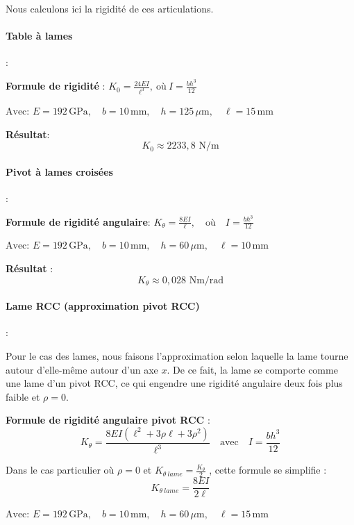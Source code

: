 \documentclass[a4paper, 11pt]{article} %
\begin{document}
Nous calculons ici la rigidité de ces articulations.

\paragraph{Table à lames} :

\textbf{Formule de rigidité} : $ K_0 = \frac{24EI}{\ell^3},\ \text{où}\ I = \frac{b h^3}{12} $


$\text{Avec: } E = 192\,\text{GPa},\quad b = 10\,\text{mm},\quad h = 125\,\mu\text{m},\quad \ell = 15\,\text{mm} $


\textbf{Résultat}: $$K_0 \approx 2233,8\text{ N}/\text{m}$$

\vspace{0.25cm}

\paragraph{Pivot à lames croisées}:

\textbf{Formule de rigidité angulaire}:
$K_\theta = \frac{8EI}{\ell}, \quad \text{où} \quad I = \frac{b h^3}{12}$



$\text{Avec: } E = 192\,\text{GPa},\quad b = 10\,\text{mm},\quad h = 60\,\mu\text{m},\quad \ell = 10\,\text{mm} $


\textbf{Résultat} : $$K_\theta \approx 0,028\text{ N}\text{m}/\text{rad}$$
 
 \paragraph{Lame RCC (approximation pivot RCC)}:
 
Pour le cas des lames, nous faisons l'approximation selon laquelle la lame tourne autour d'elle-même autour d’un axe $x$. De ce fait, la lame se comporte comme une lame d’un pivot RCC, ce qui engendre une rigidité angulaire deux fois plus faible et $\rho = 0$.

\textbf{Formule de rigidité angulaire pivot RCC} :
\[
K_\theta = \frac{8EI (\ell^2 + 3\rho\ell + 3\rho^2)}{\ell^3}
\quad \text{avec} \quad I = \frac{b h^3}{12}
\]

Dans le cas particulier où $\rho = 0$ et $K_{\theta\ lame} = \frac{K_\theta}{2} $ , cette formule se simplifie :
\[
K_{\theta\ lame} = \frac{8EI}{2\ell}
\]


$\text{Avec: } E = 192\,\text{GPa},\quad b = 10\,\text{mm},\quad h = 60\,\mu\text{m},\quad \ell = 15\,\text{mm} $
\end{document}
